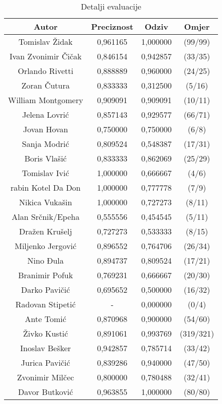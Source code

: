 \documentclass{article}
\begin{document}
\begin{table}[ht]
\caption{Detalji evaluacije}
\centering
\begin{tabular}{c c c c}
\hline\hline
Autor & Preciznost & Odziv & Omjer \\
[0.5ex]
\hline
Tomislav Židak & 0,961165 & 1,000000 & (99/99) \\
Ivan Zvonimir Čičak & 0,846154 & 0,942857 & (33/35) \\
Orlando Rivetti & 0,888889 & 0,960000 & (24/25) \\
Zoran Čutura & 0,833333 & 0,312500 & (5/16) \\
William Montgomery & 0,909091 & 0,909091 & (10/11) \\
Jelena Lovrić & 0,857143 & 0,929577 & (66/71) \\
Jovan Hovan & 0,750000 & 0,750000 & (6/8) \\
Sanja Modrić & 0,809524 & 0,548387 & (17/31) \\
Boris Vlašić & 0,833333 & 0,862069 & (25/29) \\
Tomislav Ivić & 1,000000 & 0,666667 & (4/6) \\
rabin Kotel Da Don & 1,000000 & 0,777778 & (7/9) \\
Nikica Vukašin & 1,000000 & 0,727273 & (8/11) \\
Alan Srčnik/Epeha & 0,555556 & 0,454545 & (5/11) \\
Dražen Krušelj & 0,727273 & 0,533333 & (8/15) \\
Miljenko Jergović & 0,896552 & 0,764706 & (26/34) \\
Nino Đula & 0,894737 & 0,809524 & (17/21) \\
Branimir Pofuk & 0,769231 & 0,666667 & (20/30) \\
Darko Pavičić & 0,695652 & 0,500000 & (16/32) \\
Radovan Stipetić & - & 0,000000 & (0/4) \\
Ante Tomić & 0,870968 & 0,900000 & (54/60) \\
Živko Kustić & 0,891061 & 0,993769 & (319/321) \\
Inoslav Bešker & 0,942857 & 0,785714 & (33/42) \\
Jurica Pavičić & 0,839286 & 0,940000 & (47/50) \\
Zvonimir Milčec & 0,800000 & 0,780488 & (32/41) \\
Davor Butković & 0,963855 & 1,000000 & (80/80) \\ [1ex]
\hline
\end{tabular}
\label{tbl:eval-detalji}
\end{table}
\end{document}
